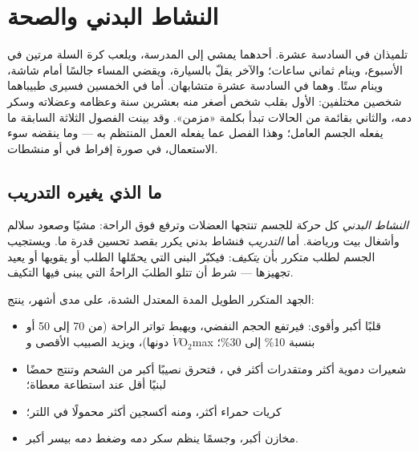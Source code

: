 \chapter{النشاط البدني والصحة}\label{ch:g10:sport-and-health}

تلميذان في السادسة عشرة. أحدهما يمشي إلى المدرسة، ويلعب كرة السلة
مرتين في الأسبوع، وينام ثماني ساعات؛ والآخر يقلّ بالسيارة، ويقضي
المساء جالسًا أمام شاشة، وينام ستًا. وهما في السادسة عشرة متشابهان.
أما في الخمسين فسيرى طبيباهما شخصين مختلفين: الأول بقلب شخص أصغر منه
بعشرين سنة وعظامه وعضلاته وسكر دمه، والثاني بقائمة من الحالات تبدأ
بكلمة «مزمن». وقد بينت الفصول الثلاثة السابقة ما يفعله الجسم العامل؛
وهذا الفصل عما يفعله العمل المنتظم به --- وما ينقضه سوء الاستعمال، في
صورة إفراط في  أو منشطات.

\section{ما الذي يغيره التدريب}

\begin{definition}\label{def:g10:sport-and-health:training}
\emph{النشاط البدني} كل حركة للجسم تنتجها العضلات
وترفع  فوق الراحة: مشيًا وصعود سلالم وأشغال بيت
ورياضة. أما \emph{التدريب} فنشاط بدني يكرر بقصد تحسين قدرة ما. ويستجيب
الجسم لطلب متكرر بأن \emph{يتكيف}: فيكبّر البنى التي يحمّلها الطلب أو
يقويها أو يعيد تجهيزها --- شرط أن تتلو الطلبَ الراحةُ التي يبنى فيها
التكيف.
\end{definition}

\begin{proposition}\label{prop:g10:sport-and-health:endurance}
الجهد المتكرر الطويل المدة المعتدل الشدة، على مدى أشهر، ينتج:
\begin{itemize}
  \item قلبًا أكبر وأقوى: فيرتفع الحجم النفضي، ويهبط تواتر الراحة (من
        70 إلى 50 أو دونها)، ويزيد الصبيب الأقصى و
        $\dot V\!\mathrm{O_2}$max بنسبة 10\% إلى 30\%؛
  \item شعيرات دموية أكثر ومتقدرات أكثر في ، فتحرق
        نصيبًا أكبر من الشحم وتنتج حمضًا لبنيًا أقل عند استطاعة معطاة؛
  \item كريات حمراء أكثر، ومنه أكسجين أكثر محمولًا في اللتر؛
  \item مخازن  أكبر، وجسمًا ينظم سكر دمه وضغط دمه بيسر أكبر.
\end{itemize}
\end{proposition}
\admitted

